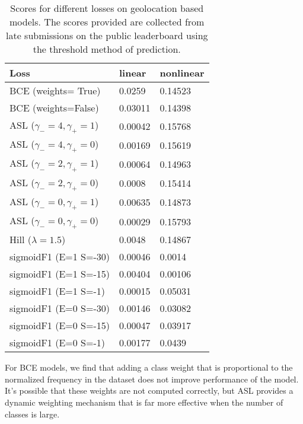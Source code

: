 \begin{table}[h]
    \caption{
        Scores for different losses on geolocation based models.
        The scores provided are collected from late submissions on the public leaderboard using the threshold method of prediction.
    }
    \label{tab:losses}
    \centering
    \begin{tabular}{|l|l|l|}
    \hline
    \textbf{Loss}               & \textbf{linear} & \textbf{nonlinear} \\ \hline
    BCE (weights= True)             & 0.0259          & 0.14523            \\ \hline
    BCE (weights=False)              & 0.03011         & 0.14398            \\ \hline
    ASL ($\gamma_{-}=4, \gamma_{+}=1$) & 0.00042         & 0.15768            \\ \hline
    ASL ($\gamma_{-}=4, \gamma_{+}=0$) & 0.00169         & 0.15619            \\ \hline
    ASL ($\gamma_{-}=2, \gamma_{+}=1$) & 0.00064         & 0.14963            \\ \hline
    ASL ($\gamma_{-}=2, \gamma_{+}=0$) & 0.0008          & 0.15414            \\ \hline
    ASL ($\gamma_{-}=0, \gamma_{+}=1$) & 0.00635         & 0.14873            \\ \hline
    ASL ($\gamma_{-}=0, \gamma_{+}=0$) & 0.00029         & 0.15793            \\ \hline
    Hill ($\lambda=1.5$)                  & 0.0048          & 0.14867            \\ \hline
    sigmoidF1 (E=1 S=-30)          & 0.00046         & 0.0014             \\ \hline
    sigmoidF1 (E=1 S=-15)          & 0.00404         & 0.00106            \\ \hline
    sigmoidF1 (E=1 S=-1)          & 0.00015         & 0.05031            \\ \hline
    sigmoidF1 (E=0 S=-30)          & 0.00146         & 0.03082            \\ \hline
    sigmoidF1 (E=0 S=-15)          & 0.00047         & 0.03917            \\ \hline
    sigmoidF1 (E=0 S=-1)          & 0.00177         & 0.0439             \\ \hline
    \end{tabular}
\end{table}

For BCE models, we find that adding a class weight that is proportional to the normalized frequency in the dataset does not improve performance of the model.
It's possible that these weights are not computed correctly, but ASL provides a dynamic weighting mechanism that is far more effective when the number of classes is large.

